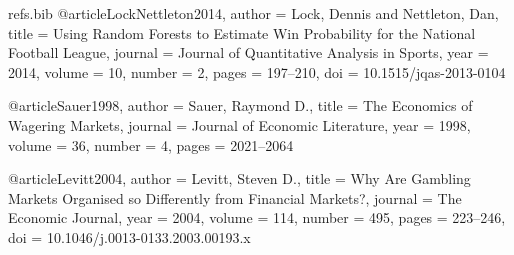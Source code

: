 \documentclass[11pt]{amsart}
\begin{document}
\begin{filecontents*}{refs.bib}
@article{LockNettleton2014,
  author  = {Lock, Dennis and Nettleton, Dan},
  title   = {Using Random Forests to Estimate Win Probability for the National Football League},
  journal = {Journal of Quantitative Analysis in Sports},
  year    = {2014},
  volume  = {10},
  number  = {2},
  pages   = {197--210},
  doi     = {10.1515/jqas-2013-0104}
}

@article{Sauer1998,
  author  = {Sauer, Raymond D.},
  title   = {The Economics of Wagering Markets},
  journal = {Journal of Economic Literature},
  year    = {1998},
  volume  = {36},
  number  = {4},
  pages   = {2021--2064}
}

@article{Levitt2004,
  author  = {Levitt, Steven D.},
  title   = {Why Are Gambling Markets Organised so Differently from Financial Markets?},
  journal = {The Economic Journal},
  year    = {2004},
  volume  = {114},
  number  = {495},
  pages   = {223--246},
  doi     = {10.1046/j.0013-0133.2003.00193.x}
}
\end{filecontents*}



\end{document}
